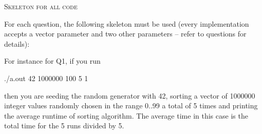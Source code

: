 \textsc{Skeleton for all code}

For each question, the following skeleton must be used (every implementation
accepts a vector parameter and two other parameters --
refer to questions for details):
{\footnotesize
{}
}

For instance for Q1, if you run 
\begin{console}[fontsize=\footnotesize]
./a.out 42 1000000 100 5 1
\end{console}
then you are seeding the random generator with 42, sorting a vector
of 1000000 integer values randomly chosen in the range 0..99
a total of 5 times and printing the
average runtime of sorting algorithm.
The average time in this case is the total time for the 5 runs 
divided by 5.
